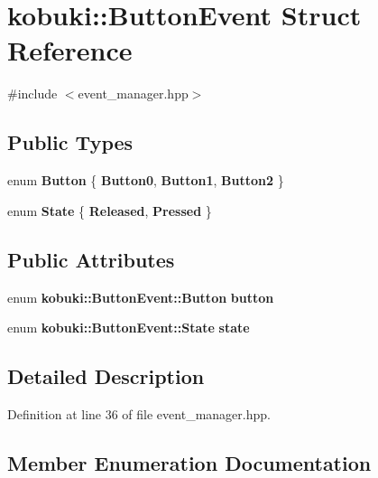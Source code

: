 \section{kobuki\-:\-:\-Button\-Event \-Struct \-Reference}
\label{structkobuki_1_1ButtonEvent}


{\ttfamily \#include $<$event\-\_\-manager.\-hpp$>$}

\subsection*{\-Public \-Types}
\begin{DoxyCompactItemize}
\item 
enum {\bf \-Button} \{ {\bf \-Button0}, 
{\bf \-Button1}, 
{\bf \-Button2}
 \}
\item 
enum {\bf \-State} \{ {\bf \-Released}, 
{\bf \-Pressed}
 \}
\end{DoxyCompactItemize}
\subsection*{\-Public \-Attributes}
\begin{DoxyCompactItemize}
\item 
enum {\bf kobuki\-::\-Button\-Event\-::\-Button} {\bf button}
\item 
enum {\bf kobuki\-::\-Button\-Event\-::\-State} {\bf state}
\end{DoxyCompactItemize}


\subsection{\-Detailed \-Description}


\-Definition at line 36 of file event\-\_\-manager.\-hpp.



\subsection{\-Member \-Enumeration \-Documentation}

